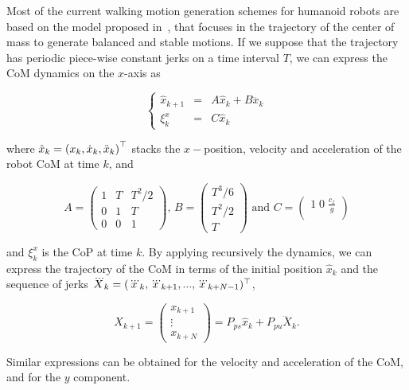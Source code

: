 \label{sec:wpg}

Most of the current walking motion generation schemes for humanoid robots are based on the model proposed in~\cite{Kajita2003}, that focuses in the trajectory of the center of mass to generate balanced and stable motions. If we suppose that the trajectory has periodic piece-wise constant jerks on a time interval $T$, we can express the CoM dynamics on the $x$-axis as

$$
\left\{
\begin{array}{ccc}
 \hat{x}_{k+1} &=& A \hat{x}_k + B \dddot{x}_k\\
 \xi^x_{k} &=& C \hat{x}_k 
\end{array}
\right.
$$

where $\hat{x}_{k} = \left( x_k, \dot{x}_k, \ddot{x}_k \right)^{\top}$ stacks the $x-$position, 
velocity and acceleration of the robot CoM at time $k$, and

\begin{equation*}
A = \left(
\begin{matrix}
1 & T & T^2/2 \\
0 & 1 & T \\
0 & 0 & 1
\end{matrix}
\right) \text{, }
B = \left(
\begin{matrix}
T^3/6 \\
T^2/2 \\
T
\end{matrix}
\right) \text{ and }
C = \left(
\begin{matrix}
1 \; 0 \; \frac{c_z}{g} \\
\end{matrix}
\right)
\end{equation*}

and ${\xi}^x_k$ is the CoP at time $k$.
By applying recursively the dynamics, we can express the trajectory of the CoM in terms of the initial position $\hat{x}_k$ and the sequence of jerks $\dddot{X}_k = (\dddot{x}_k, \dddot{x}_{k+1},...,\dddot{x}_{k+N-1})^{\top}$,

\begin{equation}
 \label{Eq:PosCMHorizon}
 X_{k+1} = \left(
 \begin{matrix}
  x_{k+1} \\
  \vdots \\
  x_{k+N}
 \end{matrix}
 \right) = P_{ps} \hat{x}_k + P_{pu} \dddot{X}_k.
\end{equation}

Similar expressions can be obtained for the velocity and acceleration of the CoM, and for the $y$ component.

